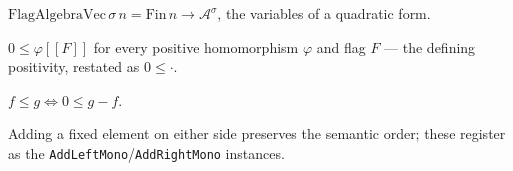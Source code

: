 \begin{definition}
  \label{def:flag-algebra-vec}
  \leanok
  $\mathrm{FlagAlgebraVec}\,\sigma\,n = \mathrm{Fin}\,n \to \mathcal{A}^\sigma$,
  the variables of a quadratic form.
\end{definition}

\begin{lemma}
  \label{lem:positivehom-basisvector-nonneg}
  \leanok
  $0 \le \varphi[\![F]\!]$ for every positive homomorphism $\varphi$ and flag
  $F$ --- the defining positivity, restated as $0 \le \cdot$.
\end{lemma}

\begin{lemma}
  \label{lem:flag-sub-nonneg}
  \leanok
  $f \le g \iff 0 \le g - f$.
\end{lemma}

\begin{lemma}
  \label{lem:order-monotone-sides}
  \leanok
  Adding a fixed element on either side preserves the semantic order; these
  register as the \texttt{AddLeftMono}/\texttt{AddRightMono} instances.
\end{lemma}
